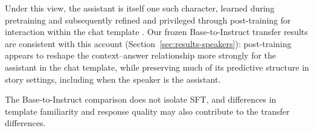 Under this view, the assistant is itself one such character, learned during pretraining and subsequently refined and privileged through post-training for interaction within the chat template \citep{g2026assistantprivilegedpersonacanonical}. Our frozen Base-to-Instruct transfer results are consistent with this account (Section~\ref{sec:results-speakers}): post-training appears to reshape the context--answer relationship more strongly for the assistant in the chat template, while preserving much of its predictive structure in story settings, including when the speaker is the assistant.

The Base-to-Instruct comparison does not isolate SFT, and differences in template familiarity and response quality may also contribute to the transfer differences.
